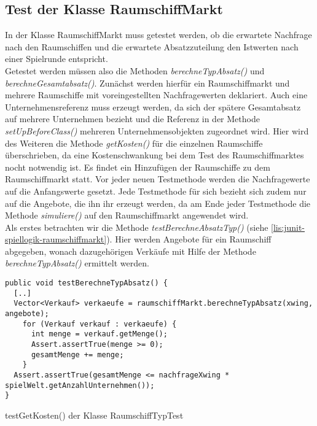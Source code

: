 \subsection{Test der Klasse RaumschiffMarkt}
\label{sub:junit-spiellogik-raumschiffmarkt}  

In der Klasse RaumschiffMarkt muss getestet werden, ob die erwartete Nachfrage nach den Raumschiffen und die erwartete Absatzzuteilung den Istwerten nach einer Spielrunde entspricht.
\\
Getestet werden müssen also die Methoden \textit{berechneTypAbsatz()} und \textit{berechneGesamtabsatz()}. Zunächst werden hierfür ein Raumschiffmarkt und mehrere Raumschiffe mit voreingestellten Nachfragewerten deklariert. Auch eine Unternehmensreferenz muss erzeugt werden, da sich der spätere Gesamtabsatz auf mehrere Unternehmen bezieht und die Referenz in der Methode \textit{setUpBeforeClass()} mehreren Unternehmensobjekten zugeordnet wird. Hier wird des Weiteren die Methode \textit{getKosten()} für die einzelnen Raumschiffe überschrieben, da eine Kostenschwankung bei dem Test des Raumschiffmarktes nocht notwendig ist. Es findet ein Hinzufügen der Raumschiffe zu dem Raumschiffmarkt statt. Vor jeder neuen Testmethode werden die Nachfragewerte auf die Anfangswerte gesetzt. Jede Testmethode für sich bezieht sich zudem nur auf die Angebote, die ihn ihr erzeugt werden, da am Ende jeder Testmethode die Methode \textit{simuliere()} auf den Raumschiffmarkt angewendet wird.
\\
Als erstes betrachten wir die Methode \textit{testBerechneAbsatzTyp()} (siehe \ref{lis:junit-spiellogik-raumschiffmarkt}). Hier werden Angebote für ein Raumschiff abgegeben, wonach dazugehörigen Verkäufe mit Hilfe der Methode \textit{berechneTypAbsatz()} ermittelt werden.

\begin{programm}[htbp]
\begin{lstlisting}[breaklines=true]
public void testBerechneTypAbsatz() {
  [..]
  Vector<Verkauf> verkaeufe = raumschiffMarkt.berechneTypAbsatz(xwing, angebote);
    for (Verkauf verkauf : verkaeufe) {
	  int menge = verkauf.getMenge();
	  Assert.assertTrue(menge >= 0);
	  gesamtMenge += menge;
    }
  Assert.assertTrue(gesamtMenge <= nachfrageXwing * spielWelt.getAnzahlUnternehmen());
}
\end{lstlisting}
\caption{testGetKosten() der Klasse RaumschiffTypTest\label{lis:junit-spiellogik-raumschiffmarkt}}
\end{programm}

